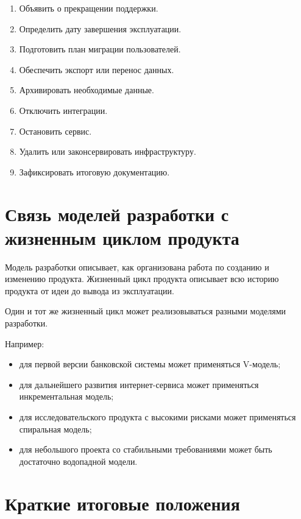 \documentclass[12pt,a4paper]{article}
\begin{document}
\begin{enumerate}
    \item Объявить о прекращении поддержки.
    \item Определить дату завершения эксплуатации.
    \item Подготовить план миграции пользователей.
    \item Обеспечить экспорт или перенос данных.
    \item Архивировать необходимые данные.
    \item Отключить интеграции.
    \item Остановить сервис.
    \item Удалить или законсервировать инфраструктуру.
    \item Зафиксировать итоговую документацию.
\end{enumerate}

\section{Связь моделей разработки с жизненным циклом продукта}

Модель разработки описывает, как организована работа по созданию и изменению продукта. Жизненный цикл продукта описывает всю историю продукта от идеи до вывода из эксплуатации.

Один и тот же жизненный цикл может реализовываться разными моделями разработки.

Например:
\begin{itemize}
    \item для первой версии банковской системы может применяться V-модель;
    \item для дальнейшего развития интернет-сервиса может применяться инкрементальная модель;
    \item для исследовательского продукта с высокими рисками может применяться спиральная модель;
    \item для небольшого проекта со стабильными требованиями может быть достаточно водопадной модели.
\end{itemize}

\section{Краткие итоговые положения}
\end{document}
